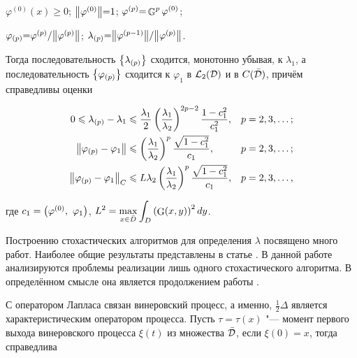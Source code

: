 $\varphi^{(0)}(x){\geqslant}0$; $\bigl\|{\varphi^{(0)}}\bigr\|{=}1$; $\varphi^{(p)}{=}\mathop{\mathbb{G}}\nolimits^p\varphi^{(0)}$;

$\varphi_{(p)}{=}{\varphi^{(p)}}/{\bigl\|{\varphi^{(p)}}\bigr\|}$; $\lambda_{(p)}{=}{\bigl\|{\varphi^{(p-1)}}\bigr\|}/{\bigl\|{\varphi^{(p)}}\bigr\|}$. \linebreak

Тогда последовательность $\left\{\lambda_{(p)}\right\}$ сходится, монотонно убывая, к $\lambda_1$, а последовательность $\left\{\varphi_{(p)}\right\}$ сходится к $\varphi_1$ в $\mathcal{L}_2(\mathcal{D})$ и в $C(\bar {\mathcal{D}})$, причём справедливы оценки

\[

    \begin{aligned}

        0\leqslant \lambda_{(p)}-\lambda_1 &\leqslant \frac{\lambda_1}{2}\left(\frac{\lambda_1}{\lambda_2}\right)^{2p-2}\frac{1-c_1^2}{c_1^2},&p&=2, 3, \ldots;\\

        \norm{\varphi_{(p)}-\varphi_1}&\leqslant\left(\frac{\lambda_1}{\lambda_2}\right)^p\frac{\sqrt{1-c_1^2}}{c_1},&p&=2, 3, \ldots;\\

        \norm{\varphi_{(p)}-\varphi_1}_C&\leqslant L\lambda_2\left(\frac{\lambda_1}{\lambda_2}\right)^p\frac{\sqrt{1-c_1^2}}{c_1},&p&=2, 3, \ldots,

    \end{aligned}

\]

где $c_1=\left({\varphi^{(0)}},\ {\varphi_1}\right)$, $\displaystyle L^2=\max\limits_{x\in\bar D}\int_D\left(\mathop{\rm G}\nolimits(x, y)\right)^2dy$.



Построению стохастических алгоритмов для определения $\lambda$ посвящено много работ. Наиболее общие результаты представлены в статье \cite{kuzn:MikMak}. В данной работе анализируются проблемы реализации лишь одного стохастического алгоритма. В определённом смысле она является продолжением работы \cite{kuzn:KuzSip}.



\smallskip




С оператором Лапласа связан винеровский процесс, а именно, $\frac{1}{2}\Delta$ является характеристическим оператором процесса. Пусть $\tau=\tau(x)$ "--- момент первого выхода винеровского процесса $\xi(t)$ из множества $\bar {\mathcal{D}}$, если $\xi(0)=x$, тогда справедлива



